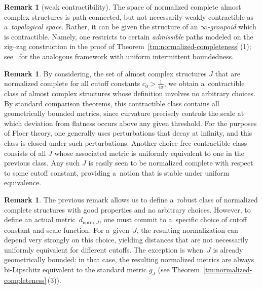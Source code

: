 \documentclass[pdftex]{sigma}
\numberwithin{equation}{section}
\theoremstyle{definition}
\newtheorem{rem}[Theorem]{Remark}
\begin{document}
\begin{rem}[weak contractibility]
The space of normalized complete almost complex structures is path connected, but not necessarily weakly contractible as a~\emph{topological space}. Rather, it can be given the structure of an \emph{$\infty$-groupoid} which is contractible. Namely, one restricts to certain \emph{admissible} paths modeled on the zig--zag construction in the proof of Theorem~\ref{tm:normalized-completeness}\,(1); see~\cite{GromanFloerOpen} for the analogous framework with uniform intermittent boundedness.
\end{rem}

\begin{rem}
By considering, the set of almost complex structures $J$ that are normalized complete for all cutoff constants $c_0 > \frac{1}{4\pi}$, we obtain a~contractible class of almost complex structures whose definition involves no arbitrary choices.
By standard comparison theorems, this contractible class contains all geometrically bounded metrics, since curvature precisely controls the scale at which deviation from flatness occurs above any given threshold.
For the purposes of Floer theory, one generally uses perturbations that decay at infinity, and this class is closed under such perturbations.
Another choice-free contractible class consists of all $J$ whose associated metric is uniformly equivalent to one in the previous class. Any such $J$ is easily seen to be normalized complete with respect to some cutoff constant, providing a~notion that is stable under uniform equivalence.
\end{rem}


\begin{rem}
 The previous remark allows us to define a~robust class of normalized complete structures with good properties and no arbitrary choices.
 However, to define an actual metric~$d_{\mathrm{norm},J}$, one must commit to a~specific choice of cutoff constant and scale function. For a~given~$J$, the resulting normalization can depend very strongly on this choice, yielding distances that are not necessarily uniformly equivalent for different cutoffs.
 The exception is when~$J$ is already geometrically bounded: in that case, the resulting normalized metrics are always bi-Lipschitz equivalent to the standard metric $g_J$ (see Theorem~\ref{tm:normalized-completeness}\,(3)).
 \end{rem}
\end{document}
